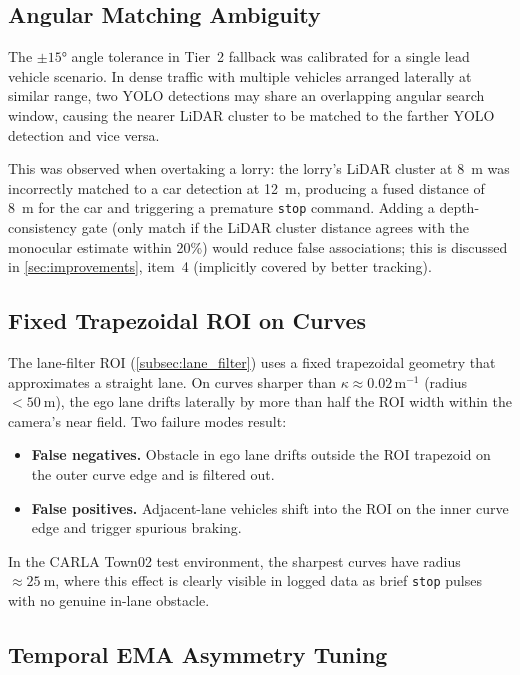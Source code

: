 \documentclass[12pt,a4paper]{article}
\begin{document}
\subsection{Angular Matching Ambiguity}

The $\pm15°$ angle tolerance in Tier~2 fallback was calibrated for a single
lead vehicle scenario.  In dense traffic with multiple vehicles arranged
laterally at similar range, two YOLO detections may share an overlapping
angular search window, causing the nearer LiDAR cluster to be matched to
the farther YOLO detection and vice versa.

This was observed when overtaking a lorry: the lorry's LiDAR cluster at
\SI{8}{\metre} was incorrectly matched to a car detection at \SI{12}{\metre},
producing a fused distance of \SI{8}{\metre} for the car and triggering a
premature \texttt{stop} command.  Adding a depth-consistency gate (only
match if the LiDAR cluster distance agrees with the monocular estimate within
20\%) would reduce false associations; this is discussed in
\cref{sec:improvements}, item~4 (implicitly covered by better tracking).

\subsection{Fixed Trapezoidal ROI on Curves}

The lane-filter ROI (\cref{subsec:lane_filter}) uses a fixed trapezoidal
geometry that approximates a straight lane.  On curves sharper than
$\kappa \approx 0.02$\,m$^{-1}$ (radius $< \SI{50}{\metre}$), the ego lane
drifts laterally by more than half the ROI width within the camera's near
field.  Two failure modes result:

\begin{itemize}[nosep]
  \item \textbf{False negatives.}  Obstacle in ego lane drifts outside the
        ROI trapezoid on the outer curve edge and is filtered out.
  \item \textbf{False positives.}  Adjacent-lane vehicles shift into the ROI
        on the inner curve edge and trigger spurious braking.
\end{itemize}

In the CARLA Town02 test environment, the sharpest curves have radius
$\approx\SI{25}{\metre}$, where this effect is clearly visible in logged data
as brief \texttt{stop} pulses with no genuine in-lane obstacle.

\subsection{Temporal EMA Asymmetry Tuning}
\end{document}
